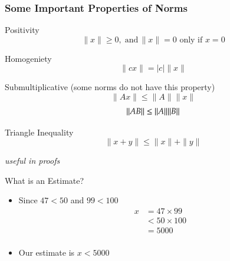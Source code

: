 \documentclass[10pt]{beamer}
\begin{document}
\begin{frame}
\frametitle{Some Important Properties of Norms}

\begin{block}{Positivity}
$$
     \|x\| \geq 0,\; \textrm{and}\,  \|x\| = 0 \textrm{ only if } x = 0
$$
\end{block}

\begin{block}{Homogeniety}
$$
     \|c x\| = |c| \|x\|
$$
\end{block}

\begin{block}{Submultiplicative (some norms do not have this property)}
$$\|Ax\| \le \|A\| \|x\| $$ 
  $$   {{\|AB\|}} \le {\ensuremath{{\|A\|}}}{\ensuremath{{\|B\|}}} $$   
\end{block}

     \begin{block}{Triangle Inequality}
         $$
     \|x+y\| \le \|x\| + \| y \|
         $$
     \end{block}

\begin{center}
    \textit{useful in proofs}
\end{center}
\end{frame}


\begin{frame}{What is an Estimate?}

\begin{itemize}
    \begin{example}
         Estimate the quantity $x = 47 \times 99$
    \end{example}
    \item Since $47<50$ and $99< 100$
    \begin{align*}
        x &= 47 \times 99 \\ 
          & < 50 \times 100 \\ 
          & = 5000 \\
    \end{align*}
    \item Our estimate is $x < 5000$
\end{itemize}    
\end{frame}
\end{document}
